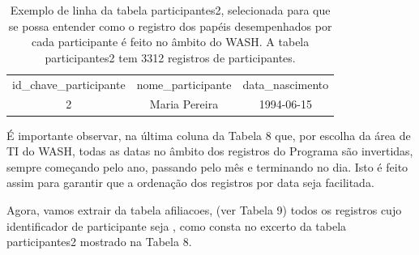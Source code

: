 \documentclass[
12pt,		%
openright,	%
twoside,  %
a4paper,			%
chapter=TITLE,		%
english,			%
french,				%
spanish,			%
brazil				%
]{USPSC-classe/USPSC}
\begin{document}
\begin{table}[htb]
\tiny
\caption{\label{96081f1bc28f7c738012f4beb3ef867b6b67107f}Exemplo de linha da tabela participantes2, selecionada para que se possa entender como o registro dos pap\'eis desempenhados por cada participante \'e feito no \^ambito do WASH. A tabela participantes2 tem 3312 registros de participantes.}

\centering
\begin{tabular}{|c|c|c|}
\hline
id\_chave\_participante  &  nome\_participante             &  data\_nascimento  \\
                     2  &  Maria Pereira  &  1994-06-15 \\
\hline
\end{tabular}
\end{table}


\'E importante observar, na \'ultima coluna da Tabela 8 que, por escolha da \'area de TI do WASH, todas as datas no \^ambito dos registros do Programa s\~ao invertidas, sempre come\c{c}ando pelo ano, passando pelo m\^es e terminando no dia. Isto \'e feito assim para garantir que a ordena\c{c}\~ao dos registros por data seja facilitada.

















Agora, vamos extrair da tabela \textquotedbl afiliacoes\textquotedbl , (ver Tabela 9) todos os registros cujo identificador de participante seja  \textquotedbl , como consta no excerto da tabela participantes2 mostrado na Tabela 8.
\end{document}
